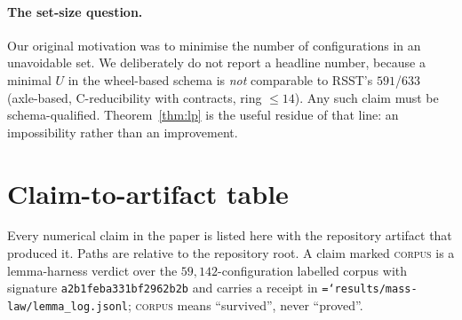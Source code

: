 \documentclass[11pt]{article}
\theoremstyle{definition}
\newcommand{\art}[1]{{\texttt{\hyphenchar\font=`\-\relax #1}}}
\begin{document}
\paragraph{The set-size question.} Our original motivation was to minimise the number
of configurations in an unavoidable set. We deliberately do not report a headline
number, because a minimal $U$ in the wheel-based schema is \emph{not} comparable to
RSST's $591$/$633$ (axle-based, C-reducibility with contracts, ring $\le14$). Any such
claim must be schema-qualified. Theorem~\ref{thm:lp} is the useful residue of that
line: an impossibility rather than an improvement.




\appendix

\section{Claim-to-artifact table}
\label{sec:artifacts}

Every numerical claim in the paper is listed here with the repository artifact that
produced it. Paths are relative to the repository root. A claim marked
\textsc{corpus} is a lemma-harness verdict over the $59{,}142$-configuration
labelled corpus with signature \texttt{a2b1feba331bf2962b2b} and carries a receipt in
\art{results/mass-law/lemma\_log.jsonl}; \textsc{corpus} means ``survived'', never
``proved''.
\end{document}
